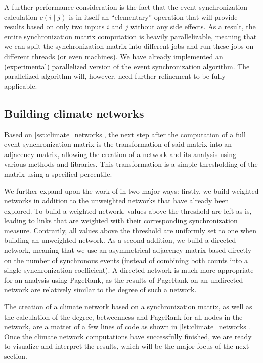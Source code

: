 A further performance consideration is the fact that the event synchronization calculation $c(i \mid j)$ is in itself an ``elementary'' operation that will provide results based on only two inputs $i$ and $j$ without any side effects. As a result, the entire synchronization matrix computation is heavily parallelizable, meaning that we can split the synchronization matrix into different jobs and run these jobs on different threads (or even machines). We have already implemented an (experimental) parallelized version of the event synchronization algorithm. The parallelized algorithm will, however, need further refinement to be fully applicable.

\subsection{Building climate networks}
\label{sst:building_climate_network}
Based on \cref{sst:climate_networks}, the next step after the computation of a full event synchronization matrix is the transformation of said matrix into an adjacency matrix, allowing the creation of a network and its analysis using various methods and libraries. This transformation is a simple thresholding of the matrix using a specified percentile.

We further expand upon the work of \citet{Stolbova.2015} in two major ways: firstly, we build weighted networks in addition to the unweighted networks that have already been explored. To build a weighted network, values above the threshold are left as is, leading to links that are weighted with their corresponding synchronization measure. Contrarily, all values above the threshold are uniformly set to one when building an unweighted network. As a second addition, we build a directed network, meaning that we use an asymmetrical adjacency matrix based directly on the number of synchronous events (instead of combining both counts into a single synchronization coefficient). A directed network is  much more appropriate for an analysis using PageRank, as the results of PageRank on an undirected network are relatively similar to the degree of such a network.

The creation of a climate network based on a synchronization matrix, as well as the calculation of the degree, betweenness and PageRank for all nodes in the network, are a matter of a few lines of code as shown in \cref{lst:climate_networks}. Once the climate network computations have successfully finished, we are ready to visualize and interpret the results, which will be the major focus of the next section.

